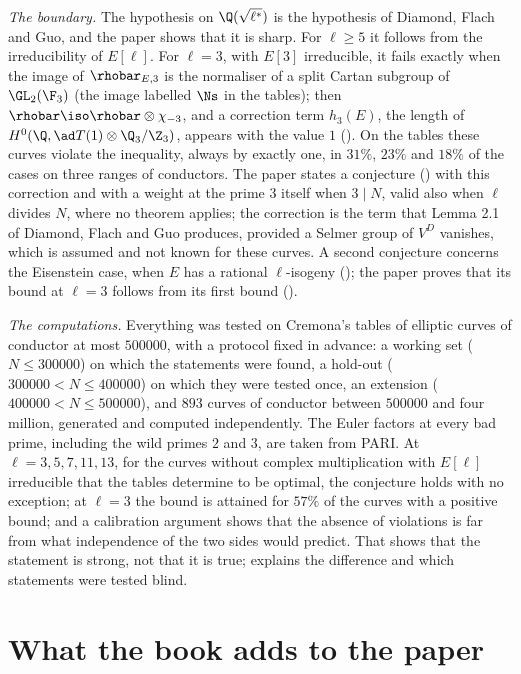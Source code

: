\emph{The boundary.} The hypothesis on $\Q(\sqrt{\ell^*})$ is the hypothesis of Diamond, Flach
and Guo, and the paper shows that it is sharp. For $\ell\ge5$ it follows from the irreducibility of
$E[\ell]$. For $\ell=3$, with $E[3]$ irreducible, it fails exactly when the image of
$\rhobar_{E,3}$ is the normaliser of a split Cartan subgroup of $\GL_2(\F_3)$ (the image labelled
$\Ns$ in the tables); then $\rhobar\iso\rhobar\otimes\chi_{-3}$, and a correction term $h_3(E)$,
the length of $H^0(\Q,\ad T(1)\otimes\Q_3/\Z_3)$, appears with the value $1$
(). On the tables these curves violate the inequality, always by
exactly one, in $31\%$, $23\%$ and $18\%$ of the cases on three ranges of conductors. The paper
states a conjecture () with this correction and with a weight at
the prime $3$ itself when $3\mid N$, valid also when $\ell$ divides $N$, where no theorem applies;
the correction is the term that Lemma 2.1 of Diamond, Flach and Guo produces, provided a Selmer
group of $V^D$ vanishes, which is assumed and not known for these curves. A second conjecture
concerns the Eisenstein case, when $E$ has a rational $\ell$-isogeny
(); the paper proves that its bound at $\ell=3$ follows from its
first bound ().

\emph{The computations.} Everything was tested on Cremona's tables of elliptic curves of
conductor at most $500000$, with a protocol fixed in advance: a working set ($N\le300000$) on
which the statements were found, a hold-out ($300000<N\le400000$) on which they were tested once,
an extension ($400000<N\le500000$), and $893$ curves of conductor between $500000$ and four
million, generated and computed independently. The Euler factors at every bad prime, including the
wild primes $2$ and $3$, are taken from PARI. At $\ell=3,5,7,11,13$, for the curves without
complex multiplication with $E[\ell]$ irreducible that the tables determine to be optimal, the
conjecture holds with no exception; at $\ell=3$ the bound is attained for $57\%$ of the curves with
a positive bound; and a calibration argument shows that the absence of violations is far from what
independence of the two sides would predict. That shows that the statement is strong, not that it
is true;  explains the difference and which statements were tested blind.

\section*{What the book adds to the paper}

